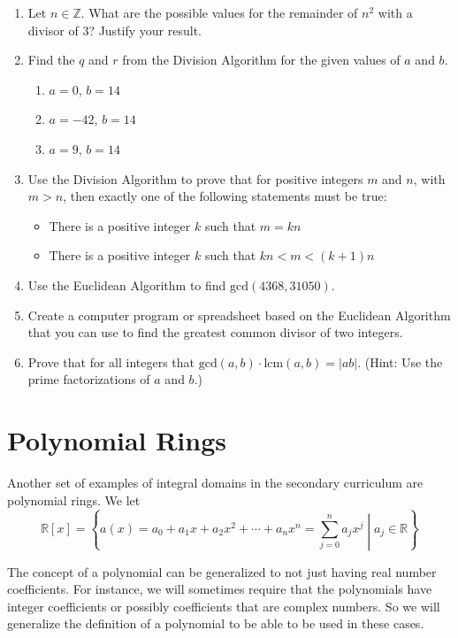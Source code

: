 \documentclass[
]{book}
\providecommand{\tightlist}{%
  \setlength{\itemsep}{0pt}\setlength{\parskip}{0pt}}
\theoremstyle{definition}
\theoremstyle{definition}
\theoremstyle{definition}
\theoremstyle{definition}
\theoremstyle{remark}
\begin{document}
\begin{enumerate}
\def\labelenumi{\arabic{enumi}.}
\item
  Let \(n\in \mathbb{Z}\). What are the possible values for the remainder of \(n^2\) with a divisor of \(3\)? Justify your result.
\item
  Find the \(q\) and \(r\) from the Division Algorithm for the given values of \(a\) and \(b\).

  \begin{enumerate}
  \def\labelenumii{\alph{enumii}.}
  \tightlist
  \item
    \(a=0\), \(b=14\)
  \item
    \(a=-42\), \(b=14\)
  \item
    \(a=9\), \(b=14\)
  \end{enumerate}
\item
  Use the Division Algorithm to prove that for positive integers \(m\) and \(n\), with \(m > n\), then exactly one of the following statements must be true:

  \begin{itemize}
  \tightlist
  \item
    There is a positive integer \(k\) such that \(m = kn\)
  \item
    There is a positive integer \(k\) such that \(kn < m < (k + 1)n\)
  \end{itemize}
\item
  Use the Euclidean Algorithm to find \(\mathrm{gcd}(4368,31050)\).
\item
  Create a computer program or spreadsheet based on the Euclidean Algorithm that you can use to find the greatest common divisor of two integers.
\item
  Prove that for all integers that \(\mathrm{gcd}(a,b)\cdot \mathrm{lcm}(a,b) = |ab|\). (Hint: Use the prime factorizations of \(a\) and \(b\).)
\end{enumerate}

\hypertarget{polynomial-rings}{%
\section{Polynomial Rings}\label{polynomial-rings}}

Another set of examples of integral domains in the secondary curriculum are polynomial rings. We let \[\mathbb{R}[x]= \left\{ a(x)=a_0 + a_1 x + a_2 x^2 + \cdots + a_n x^n =\sum_{j=0}^n a_j x^j  \middle \vert a_j \in \mathbb{R} \right\}\]

The concept of a polynomial can be generalized to not just having real number coefficients. For instance, we will sometimes require that the polynomials have integer coefficients or possibly coefficients that are complex numbers. So we will generalize the definition of a polynomial to be able to be used in these cases.
\end{document}
